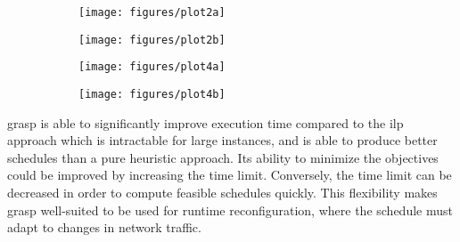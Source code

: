 \begin{figure}[t]
\centering
	\begin{subfigure}{\linewidth}
        \centering
        \texttt{[image: figures/plot2a]}
        \caption{}
        \label{fig:grasp_heuristic_q}
   \end{subfigure}
	\begin{subfigure}{\linewidth}
        \centering
        \texttt{[image: figures/plot2b]}
        \caption{}
        \label{fig:grasp_heuristic_e2e}
   \end{subfigure}
	\begin{subfigure}{\linewidth}
        \centering
        \texttt{[image: figures/plot4a]}
        \caption{}
        \label{fig:grasp_ilp_q}
   \end{subfigure}
	\begin{subfigure}{\linewidth}
        \centering
        \texttt{[image: figures/plot4b]}
        \caption{}
        \label{fig:grasp_ilp_e2e}
   \end{subfigure}
   \caption{}
\label{fig:grasp_ilp_heuristic}
\end{figure}


\gls{grasp} is able to significantly improve execution time compared to the \gls{ilp} approach which is intractable for large instances, and is able to produce better schedules than a pure heuristic approach. Its ability to minimize the objectives could be improved by increasing the time limit. Conversely, the time limit can be decreased in order to compute feasible schedules quickly. This flexibility makes \gls{grasp} well-suited to be used for runtime reconfiguration, where the schedule must adapt to changes in network traffic. 